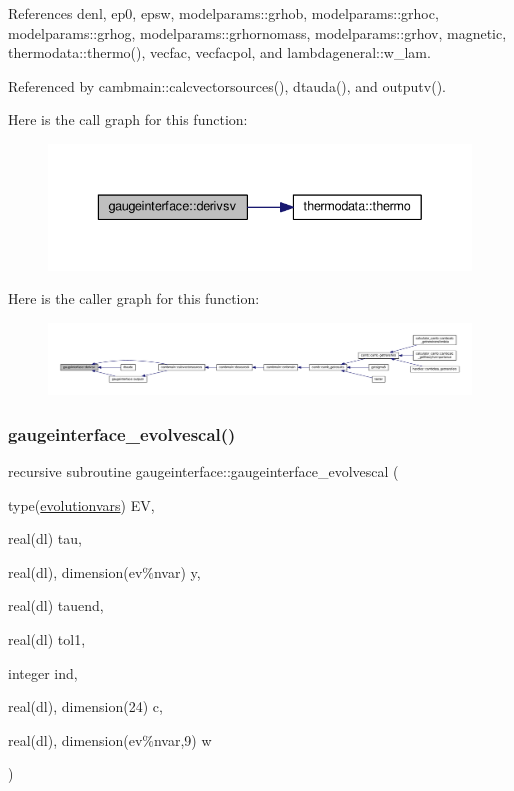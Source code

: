 References denl, ep0, epsw, modelparams\+::grhob, modelparams\+::grhoc, modelparams\+::grhog, modelparams\+::grhornomass, modelparams\+::grhov, magnetic, thermodata\+::thermo(), vecfac, vecfacpol, and lambdageneral\+::w\+\_\+lam.



Referenced by cambmain\+::calcvectorsources(), dtauda(), and outputv().

Here is the call graph for this function\+:
\nopagebreak
\begin{figure}[H]
\begin{center}
\leavevmode
\includegraphics[width=336pt]{namespacegaugeinterface_a25ee0c9e055aabce6b7eb205e65f9804_cgraph}
\end{center}
\end{figure}
Here is the caller graph for this function\+:
\nopagebreak
\begin{figure}[H]
\begin{center}
\leavevmode
\includegraphics[width=350pt]{namespacegaugeinterface_a25ee0c9e055aabce6b7eb205e65f9804_icgraph}
\end{center}
\end{figure}
\mbox{\label{namespacegaugeinterface_a11f5c8bd6a22537e4a85362dc8dbf3af}} 
\subsubsection{\texorpdfstring{gaugeinterface\+\_\+evolvescal()}{gaugeinterface\_evolvescal()}}
{\footnotesize\ttfamily recursive subroutine gaugeinterface\+::gaugeinterface\+\_\+evolvescal (\begin{DoxyParamCaption}\item[{type(\mbox{\hyperlink{structgaugeinterface_1_1evolutionvars}{evolutionvars}})}]{EV,  }\item[{real(dl)}]{tau,  }\item[{real(dl), dimension(ev\%nvar)}]{y,  }\item[{real(dl)}]{tauend,  }\item[{real(dl)}]{tol1,  }\item[{integer}]{ind,  }\item[{real(dl), dimension(24)}]{c,  }\item[{real(dl), dimension(ev\%nvar,9)}]{w }\end{DoxyParamCaption})}



